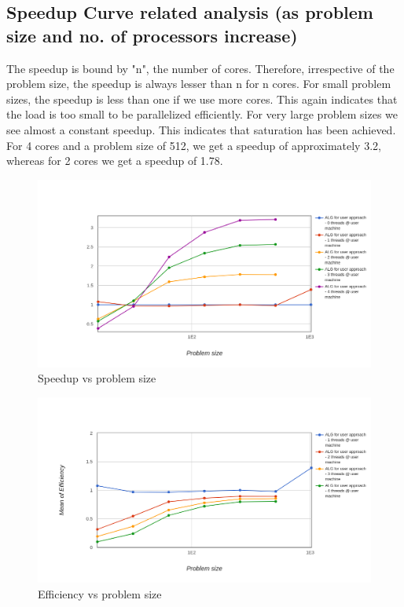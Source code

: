 \documentclass[runningheads, a4paper, oribibl]{llncs}
\begin{document}
\subsection{Speedup Curve related analysis (as problem size and no. of processors increase)}
The speedup is bound by "n", the number of cores. Therefore, irrespective of the problem size, the speedup is always lesser than n for n cores. For small problem sizes, the speedup is less than one if we use more cores. This again indicates that the load is too small to be parallelized efficiently. For very large problem sizes we see almost a constant speedup. This indicates that saturation has been achieved.  For 4 cores and a problem size of 512,  we get a speedup of approximately 3.2, whereas for 2 cores we get a speedup of 1.78.
\newpage
\begin{figure}[t]
    \centering
    \includegraphics[width=\textwidth]{p2.png}
    \caption{Speedup vs problem size}
    \label{fig:p2}
\end{figure}
\begin{figure}[b]
    \centering
    \includegraphics[width=\textwidth]{p3.png}
    \caption{Efficiency vs problem size}
    \label{fig:p3}
\end{figure}
\newpage
\end{document}
